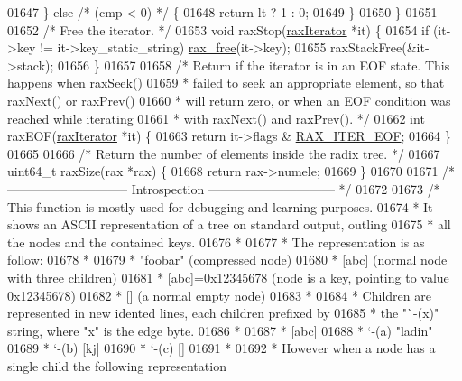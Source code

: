 \begin{DoxyCode}
{{{{{{{{{{{{{{{{{{{{{{{{01647     \} \textcolor{keywordflow}{else} \textcolor{comment}{/* (cmp < 0) */} \{
01648         \textcolor{keywordflow}{return} lt ? 1 : 0;
01649     \}
01650 \}
01651 
01652 \textcolor{comment}{/* Free the iterator. */}
01653 \textcolor{keywordtype}{void} raxStop(\hyperlink{structraxIterator}{raxIterator} *it) \{
01654     \textcolor{keywordflow}{if} (it->key != it->key\_static\_string) \hyperlink{rax__malloc_8h_a3adfa16bca6cd23b6e125fd441465e49}{rax\_free}(it->key);
01655     raxStackFree(&it->stack);
01656 \}
01657 
01658 \textcolor{comment}{/* Return if the iterator is in an EOF state. This happens when raxSeek()}
01659 \textcolor{comment}{ * failed to seek an appropriate element, so that raxNext() or raxPrev()}
01660 \textcolor{comment}{ * will return zero, or when an EOF condition was reached while iterating}
01661 \textcolor{comment}{ * with raxNext() and raxPrev(). */}
01662 \textcolor{keywordtype}{int} raxEOF(\hyperlink{structraxIterator}{raxIterator} *it) \{
01663     \textcolor{keywordflow}{return} it->flags & \hyperlink{rax_8h_a4fb08a914b84ba0a39daa86297176e1c}{RAX\_ITER\_EOF};
01664 \}
01665 
01666 \textcolor{comment}{/* Return the number of elements inside the radix tree. */}
01667 uint64\_t raxSize(rax *rax) \{
01668     \textcolor{keywordflow}{return} rax->numele;
01669 \}
01670 
01671 \textcolor{comment}{/* ----------------------------- Introspection ------------------------------ */}
01672 
01673 \textcolor{comment}{/* This function is mostly used for debugging and learning purposes.}
01674 \textcolor{comment}{ * It shows an ASCII representation of a tree on standard output, outling}
01675 \textcolor{comment}{ * all the nodes and the contained keys.}
01676 \textcolor{comment}{ *}
01677 \textcolor{comment}{ * The representation is as follow:}
01678 \textcolor{comment}{ *}
01679 \textcolor{comment}{ *  "foobar" (compressed node)}
01680 \textcolor{comment}{ *  [abc] (normal node with three children)}
01681 \textcolor{comment}{ *  [abc]=0x12345678 (node is a key, pointing to value 0x12345678)}
01682 \textcolor{comment}{ *  [] (a normal empty node)}
01683 \textcolor{comment}{ *}
01684 \textcolor{comment}{ *  Children are represented in new idented lines, each children prefixed by}
01685 \textcolor{comment}{ *  the "`-(x)" string, where "x" is the edge byte.}
01686 \textcolor{comment}{ *}
01687 \textcolor{comment}{ *  [abc]}
01688 \textcolor{comment}{ *   `-(a) "ladin"}
01689 \textcolor{comment}{ *   `-(b) [kj]}
01690 \textcolor{comment}{ *   `-(c) []}
01691 \textcolor{comment}{ *}
01692 \textcolor{comment}{ *  However when a node has a single child the following representation}
}}}}}}}}}}}}}}}}}}}}}}}}
\end{DoxyCode}
